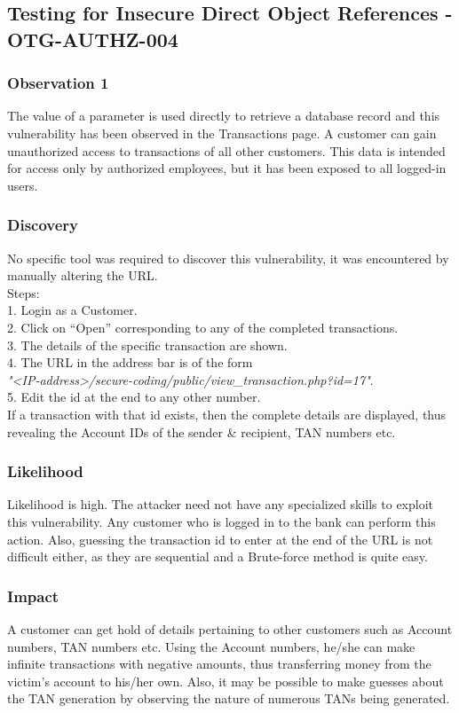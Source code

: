 \subsection{Testing for Insecure Direct Object References - OTG-AUTHZ-004}

\subsubsection{Observation 1}
The value of a parameter is used directly to retrieve a database record and this vulnerability has been observed in the Transactions page.
A customer can gain unauthorized access to transactions of all other customers. This data is intended for access only by authorized employees, but it has been exposed to all logged-in users. 

\subsubsection{Discovery}
No specific tool was required to discover this vulnerability, it was encountered by manually altering the URL.\\
Steps: \\
1. Login as a Customer. \\
2. Click on “Open” corresponding to any of the completed transactions. \\
3. The details of the specific transaction are shown. \\
4. The URL in the address bar is of the form \\ \textit{"<IP-address>/secure-coding/public/view\_transaction.php?id=17"}. \\
5. Edit the id at the end to any other number. \\
If a transaction with that id exists, then the complete details are displayed, thus revealing the Account IDs of the sender \& recipient, TAN numbers etc. \\

\subsubsection{Likelihood}
Likelihood is high.
The attacker need not have any specialized skills to exploit this vulnerability. Any customer who is logged in to the bank can perform this action. Also, guessing the transaction id to enter at the end of the URL is not difficult either, as they are sequential and a Brute-force method is quite easy.

\subsubsection{Impact}
A customer can get hold of details pertaining to other customers such as Account numbers, TAN numbers etc. Using the Account numbers, he/she can make infinite transactions with negative amounts, thus transferring money from the victim's account to his/her own.
Also, it may be possible to make guesses about the TAN generation by observing the nature of numerous TANs being generated.

